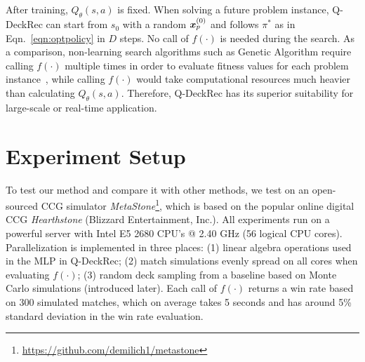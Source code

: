 After training, $Q_\theta(s,a)$ is fixed. When solving a future problem instance, Q-DeckRec can start from $s_0$ with a random $\boldsymbol{x}_p^{(0)}$ and follows $\pi^*$ as in Eqn.~\ref{eqn:optpolicy} in $D$ steps. No call of $f(\cdot)$ is needed during the search. As a comparison, non-learning search algorithms such as Genetic Algorithm require calling $f(
\cdot)$ multiple times in order to evaluate fitness values for each problem instance~\citep{garcia2016evolutionary,bjorke2017deckbuilding}, while calling $f(\cdot)$ would take computational resources much heavier than calculating $Q_\theta(s,a)$. Therefore, Q-DeckRec has its superior suitability for large-scale or real-time application.







\section{Experiment Setup}\label{sec:qdeckrec_exp}
To test our method and compare it with other methods, we test on an open-sourced CCG simulator \textit{MetaStone}\footnote{\url{https://github.com/demilich1/metastone}}, which is  based on the popular online digital CCG \textit{Hearthstone} (Blizzard Entertainment, Inc.). All experiments run on a powerful server with Intel E5 2680 CPU’s @ 2.40 GHz (56 logical CPU cores). Parallelization is implemented in three places: (1) linear algebra operations used in the MLP in Q-DeckRec; (2) match simulations evenly spread on all cores when evaluating $f(\cdot)$; (3) random deck sampling from a baseline based on Monte Carlo simulations (introduced later). Each call of $f(\cdot)$ returns a win rate based on 300 simulated matches, which on average takes 5 seconds and has around 5\% standard deviation in the win rate evaluation. 


